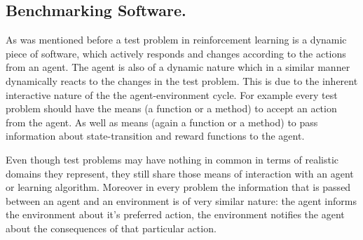 %

\subsection{Benchmarking Software.}
As was mentioned before a test problem in reinforcement learning is a dynamic piece of software, which actively responds and changes according to the actions from an agent. The agent is also of a dynamic nature which in a similar manner dynamically reacts to the changes in the test problem. This is due to the inherent interactive nature of the the agent-environment cycle. For example every test problem should have the means (a function or a method) to accept an action from the agent. As well as means (again a function or a method) to pass information about state-transition and reward functions to the agent.

Even though test problems may have nothing in common in terms of realistic domains they represent, they still share those means of interaction with an agent or learning algorithm. Moreover in every problem the information that is passed between an agent and an environment is of very similar nature: the agent informs the environment about it's preferred action, the environment notifies the agent about the consequences of that particular action.

